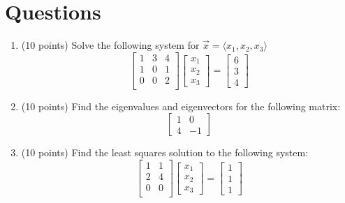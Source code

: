\documentclass[12pt, a4paper]{article}
\theoremstyle{break}
\begin{document}
\section{Questions}
\begin{enumerate}
\item (10  points) Solve the following system for $\vec{x}=\langle x_1,x_2,x_3 \rangle$
\begin{equation}
\begin{bmatrix}
1 & 3 &4  \\
1 & 0 & 1 \\
0 & 0 & 2 \\
\end{bmatrix}
\begin{bmatrix}
x_1\\
x_2 \\
x_3 
\end{bmatrix}=
\begin{bmatrix}
6 \\
3 \\
4
\end{bmatrix} \nonumber
\end{equation} 
\newpage
\item (10 points)  Find the eigenvalues and eigenvectors for the following matrix:
\begin{equation}
\begin{bmatrix}
1 & 0 \\
4 & -1
\end{bmatrix}
\nonumber
\end{equation}
\newpage

\item (10 points) Find the least squares solution to the following system:
\begin{equation}
\begin{bmatrix}
1 & 1 \\ 
2 & 4 \\
0 & 0 \\
\end{bmatrix}
\begin{bmatrix}
x_1 \\
x_2 \\
x_3 
\end{bmatrix}
=
\begin{bmatrix}
1 \\
1 \\
1 
\end{bmatrix} \nonumber
\end{equation}
\newpage


\end{enumerate}
\end{document}
